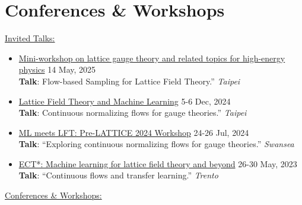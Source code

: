 \documentclass[11pt, letterpaper]{article}
\newcommand{\dateright}[1]{\hfill{\small\color{accentblue} #1}}
\begin{document}
\section*{Conferences \& Workshops}
\underline{Invited Talks:}
\begin{itemize}[left=0pt, itemsep=5pt]
    \item {\href{https://indico.phys.nthu.edu.tw/event/149/timetable/#20250514}{Mini-workshop on lattice gauge theory and related topics for high-energy physics}} \dateright{ 14 May, 2025} \\
    {\footnotesize \textbf{Talk}: Flow-based Sampling for Lattice Field Theory.”} \dateright{{\color{black}\textit{Taipei}}}
    
    \item {\href{https://indico.phys.sinica.edu.tw/event/133/}{Lattice Field Theory and Machine Learning}} \dateright{ 5-6 Dec, 2024} \\
    {\footnotesize \textbf{Talk}: Continuous normalizing flows for gauge theories.”} \dateright{{\color{black}\textit{Taipei}}}

    \item {\href{http://pyweb.swan.ac.uk/~aarts/ml-lft-2024-programme.html}{ML meets LFT: Pre-LATTICE 2024 Workshop}} \dateright{ 24-26 Jul, 2024} \\
    {\footnotesize \textbf{Talk}: “Exploring continuous normalizing flows for gauge theories.”} \dateright{{\color{black}\textit{Swansea}}}

    \item {\href{https://indico.ectstar.eu/event/171/contributions/3849/}{ECT*: Machine learning for lattice field theory and beyond}} \dateright{ 26-30 May, 2023} \\
    {\footnotesize \textbf{Talk}: “Continuous flows and transfer learning.”} \dateright{{\color{black}\textit{Trento}}}

\end{itemize}

\underline{Conferences \& Workshops:}
\end{document}
